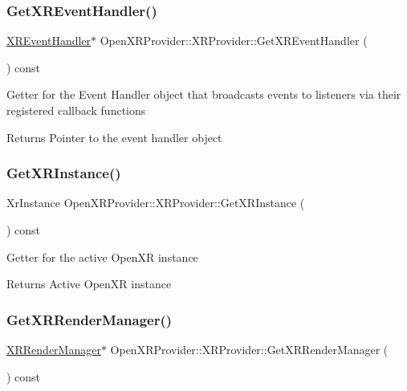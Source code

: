 \subsubsection{\texorpdfstring{GetXREventHandler()}{GetXREventHandler()}}
{\footnotesize\ttfamily \mbox{\hyperlink{class_open_x_r_provider_1_1_x_r_event_handler}{X\+R\+Event\+Handler}}$\ast$ Open\+X\+R\+Provider\+::\+X\+R\+Provider\+::\+Get\+X\+R\+Event\+Handler (\begin{DoxyParamCaption}{ }\end{DoxyParamCaption}) const\hspace{0.3cm}{\ttfamily [inline]}}

Getter for the Event Handler object that broadcasts events to listeners via their registered callback functions \begin{DoxyReturn}{Returns}
Pointer to the event handler object 
\end{DoxyReturn}
\mbox{\label{class_open_x_r_provider_1_1_x_r_provider_a9e108c811e6fbb6ddd1e00e96c675fba}} 
\subsubsection{\texorpdfstring{GetXRInstance()}{GetXRInstance()}}
{\footnotesize\ttfamily Xr\+Instance Open\+X\+R\+Provider\+::\+X\+R\+Provider\+::\+Get\+X\+R\+Instance (\begin{DoxyParamCaption}{ }\end{DoxyParamCaption}) const\hspace{0.3cm}{\ttfamily [inline]}}

Getter for the active Open\+XR instance \begin{DoxyReturn}{Returns}
Active Open\+XR instance 
\end{DoxyReturn}
\mbox{\label{class_open_x_r_provider_1_1_x_r_provider_a23af3c59dab3caab02728403adae13f4}} 
\subsubsection{\texorpdfstring{GetXRRenderManager()}{GetXRRenderManager()}}
{\footnotesize\ttfamily \mbox{\hyperlink{class_open_x_r_provider_1_1_x_r_render_manager}{X\+R\+Render\+Manager}}$\ast$ Open\+X\+R\+Provider\+::\+X\+R\+Provider\+::\+Get\+X\+R\+Render\+Manager (\begin{DoxyParamCaption}{ }\end{DoxyParamCaption}) const\hspace{0.3cm}{\ttfamily [inline]}}

